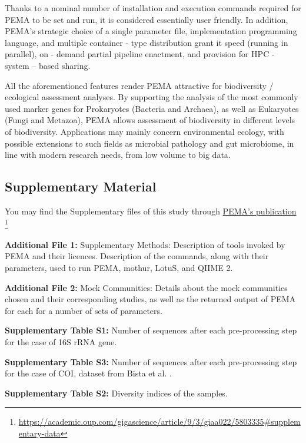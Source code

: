    Thanks to a nominal number of installation and execution commands required for PEMA to be set and run, it is considered essentially user friendly. 
   In addition, PEMA's strategic choice of a single parameter file, implementation programming language, and multiple container - type distribution grant it speed (running in parallel), on - demand partial pipeline enactment, and provision for HPC - system – based sharing.

   All the aforementioned features render PEMA attractive for biodiversity / ecological assessment analyses. 
   By supporting the analysis of the most commonly used marker genes for Prokaryotes (Bacteria and Archaea), as well as Eukaryotes (Fungi and Metazoa), PEMA allows assessment of biodiversity in different levels of biodiversity. 
   Applications may mainly concern environmental ecology, with possible extensions to such fields as microbial pathology and gut microbiome, in line with modern research needs, from low volume to big data.
   \subsection{Supplementary Material}

   You may find the Supplementary files of this study through 
   \href{https://academic.oup.com/gigascience/article/9/3/giaa022/5803335#supplementary-data}{PEMA's publication}
   \footnote{\href{https://academic.oup.com/gigascience/article/9/3/giaa022/5803335\#supplementary-data}{https://academic.oup.com/gigascience/article/9/3/giaa022/5803335\#supplementary-data}}


\textbf{Additional File 1:} Supplementary Methods: Description of tools invoked by PEMA and their licences. Description of the commands, along with their parameters, used to run PEMA, mothur, LotuS, and QIIME 2.

\textbf{Additional File 2:} Mock Communities: Details about the mock communities chosen and their corresponding studies, as well as the returned output of PEMA for each for a number of sets of parameters.

\textbf{Supplementary Table S1:} Number of sequences after each pre-processing step for the case of 16S rRNA gene.

\textbf{Supplementary Table S3:} Number of sequences after each pre-processing step for the case of COI, dataset from Bista et al. \citep{bista2017annual}.

\textbf{Supplementary Table S2:} Diversity indices of the samples.

